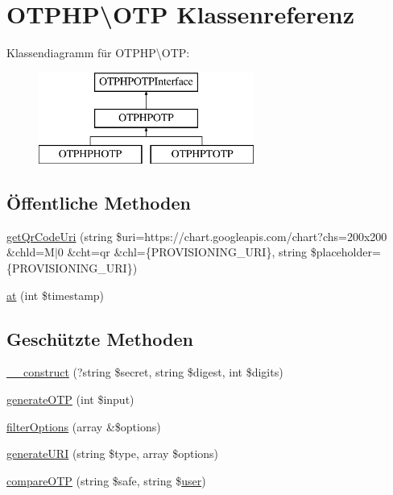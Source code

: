 \hypertarget{class_o_t_p_h_p_1_1_o_t_p}{}\section{O\+T\+P\+HP\textbackslash{}O\+TP Klassenreferenz}
\label{class_o_t_p_h_p_1_1_o_t_p}
Klassendiagramm für O\+T\+P\+HP\textbackslash{}O\+TP\+:\begin{figure}[H]
\begin{center}
\leavevmode
\includegraphics[height=3.000000cm]{class_o_t_p_h_p_1_1_o_t_p}
\end{center}
\end{figure}
\subsection*{Öffentliche Methoden}
\begin{DoxyCompactItemize}
\item 
\mbox{\hyperlink{class_o_t_p_h_p_1_1_o_t_p_ae493db3f8faece1824803b2798042232}{get\+Qr\+Code\+Uri}} (string \$uri=\textquotesingle{}https\+://chart.\+googleapis.\+com/chart?chs=200x200 \&chld=\+M$\vert$0 \&cht=qr \&chl=\{\+P\+R\+O\+V\+I\+S\+I\+O\+N\+I\+N\+G\+\_\+\+U\+R\+I\}\textquotesingle{}, string \$placeholder=\textquotesingle{}\{\+P\+R\+O\+V\+I\+S\+I\+O\+N\+I\+N\+G\+\_\+\+U\+R\+I\}\textquotesingle{})
\item 
\mbox{\hyperlink{class_o_t_p_h_p_1_1_o_t_p_a617f9d7e43bbea2ff1528ca41b647629}{at}} (int \$timestamp)
\end{DoxyCompactItemize}
\subsection*{Geschützte Methoden}
\begin{DoxyCompactItemize}
\item 
\mbox{\hyperlink{class_o_t_p_h_p_1_1_o_t_p_a1e13e5fab3ecfed56270b0e409828799}{\+\_\+\+\_\+construct}} (?string \$secret, string \$digest, int \$digits)
\item 
\mbox{\hyperlink{class_o_t_p_h_p_1_1_o_t_p_a82e51d31ace373dd0ee8b483fc78e77b}{generate\+O\+TP}} (int \$input)
\item 
\mbox{\hyperlink{class_o_t_p_h_p_1_1_o_t_p_abaca8e28e2692474e9c34fc2b24ec86e}{filter\+Options}} (array \&\$options)
\item 
\mbox{\hyperlink{class_o_t_p_h_p_1_1_o_t_p_a4457811fb3eae85319da3c719e936f0c}{generate\+U\+RI}} (string \$type, array \$options)
\item 
\mbox{\hyperlink{class_o_t_p_h_p_1_1_o_t_p_aae30cf7398096ffa62a46db5b39fb0c3}{compare\+O\+TP}} (string \$safe, string \$\mbox{\hyperlink{classuser}{user}})
\end{DoxyCompactItemize}


